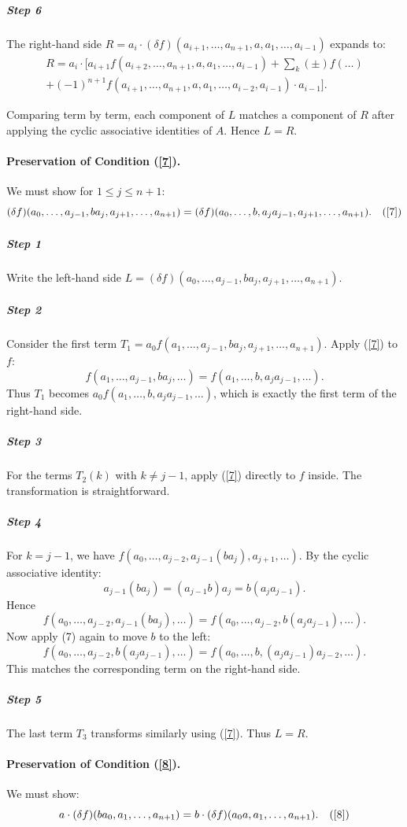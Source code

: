 \documentclass[pdflatex,sn-mathphys-num]{sn-jnl}%
\theoremstyle{thmstyleone}%
\theoremstyle{thmstyletwo}%
\theoremstyle{thmstylethree}%
\begin{document}
\subparagraph{Step 6} The right-hand side $R = a_i \cdot (\delta f)(a_{i+1}, \dots, a_{n+1}, a, a_1, \dots, a_{i-1})$ expands to:
\begin{align*}
R = a_i \cdot \Bigg[ a_{i+1} f(a_{i+2}, \dots, a_{n+1}, a, a_1, \dots, a_{i-1}) + \sum_{k} (\pm) f(\dots) \\+ (-1)^{n+1} f(a_{i+1}, \dots, a_{n+1}, a, a_1, \dots, a_{i-2}, a_{i-1}) \cdot a_{i-1} \Bigg].
\end{align*}

Comparing term by term, each component of $L$ matches a component of $R$ after applying the cyclic associative identities of $A$. Hence $L = R$.

\medskip
\paragraph{Preservation of Condition (\ref{7}).}
We must show for $1 \le j \le n+1$:
\[
(\delta f)(a_0, \dots, a_{j-1}, b a_j, a_{j+1}, \dots, a_{n+1}) = (\delta f)(a_0, \dots, b, a_j a_{j-1}, a_{j+1}, \dots, a_{n+1}). \quad (\ref{7}) 
\]

\subparagraph{Step 1} Write the left-hand side $L = (\delta f)(a_0, \dots, a_{j-1}, b a_j, a_{j+1}, \dots, a_{n+1})$.

\subparagraph{Step 2} Consider the first term $T_1 = a_0 f(a_1, \dots, a_{j-1}, b a_j, a_{j+1}, \dots, a_{n+1})$. Apply (\ref{7}) to $f$:
\[
f(a_1, \dots, a_{j-1}, b a_j, \dots) = f(a_1, \dots, b, a_j a_{j-1}, \dots).
\]
Thus $T_1$ becomes $a_0 f(a_1, \dots, b, a_j a_{j-1}, \dots)$, which is exactly the first term of the right-hand side.

\subparagraph{Step 3} For the terms $T_2(k)$ with $k \neq j-1$, apply (\ref{7}) directly to $f$ inside. The transformation is straightforward.

\subparagraph{Step 4} For $k = j-1$, we have $f(a_0, \dots, a_{j-2}, a_{j-1}(b a_j), a_{j+1}, \dots)$. By the cyclic associative identity:
\[
a_{j-1}(b a_j) = (a_{j-1} b) a_j = b (a_j a_{j-1}).
\]
Hence
\[
f(a_0, \dots, a_{j-2}, a_{j-1}(b a_j), \dots) = f(a_0, \dots, a_{j-2}, b (a_j a_{j-1}), \dots).
\]
Now apply (7) again to move $b$ to the left:
\[
f(a_0, \dots, a_{j-2}, b (a_j a_{j-1}), \dots) = f(a_0, \dots, b, (a_j a_{j-1}) a_{j-2}, \dots).
\]
This matches the corresponding term on the right-hand side.

\subparagraph{Step 5} The last term $T_3$ transforms similarly using (\ref{7}). Thus $L = R$.

\medskip
\paragraph{Preservation of Condition (\ref{8}).}
We must show:
\[
a \cdot (\delta f)(b a_0, a_1, \dots, a_{n+1}) = b \cdot (\delta f)(a_0 a, a_1, \dots, a_{n+1}).\quad (\ref{8})
\]
\end{document}
